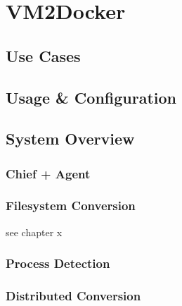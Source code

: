 \chapter{VM2Docker}

\section{Use Cases}
\section{Usage \& Configuration}
\section{System Overview}
\subsection{Chief + Agent}
\subsection{Filesystem Conversion}
see chapter x
\subsection{Process Detection}
\subsection{Distributed Conversion}